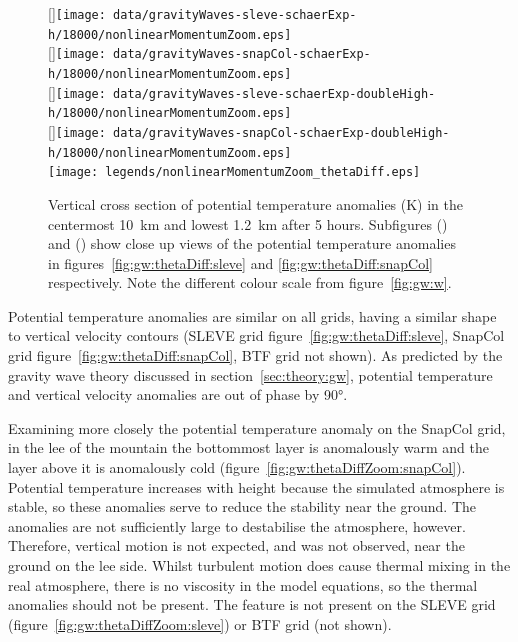 \begin{figure}
	\captionsetup[subfigure]{position=b}
	\centering
	[\textwidth]{\texttt{[image: data/gravityWaves-sleve-schaerExp-h/18000/nonlinearMomentumZoom.eps]}} \\
	[\textwidth]{\texttt{[image: data/gravityWaves-snapCol-schaerExp-h/18000/nonlinearMomentumZoom.eps]}} \\
	[\textwidth]{\texttt{[image: data/gravityWaves-sleve-schaerExp-doubleHigh-h/18000/nonlinearMomentumZoom.eps]}} \\
	[\textwidth]{\texttt{[image: data/gravityWaves-snapCol-schaerExp-doubleHigh-h/18000/nonlinearMomentumZoom.eps]}} \\
%
	\texttt{[image: legends/nonlinearMomentumZoom\_thetaDiff.eps]}
	\caption{Vertical cross section of potential temperature anomalies (\si{\kelvin}) in the centermost \SI{10}{\kilo\meter} and lowest \SI{1.2}{\kilo\meter} after 5 hours.  Subfigures () and () show close up views of the potential temperature anomalies in figures~\ref{fig:gw:thetaDiff:sleve} and \ref{fig:gw:thetaDiff:snapCol} respectively.  Note the different colour scale from figure~\ref{fig:gw:w}.}
	\label{fig:gw:thetaDiffZoom}
\end{figure}

Potential temperature anomalies are similar on all grids, having a similar shape to vertical velocity contours (SLEVE grid figure~\ref{fig:gw:thetaDiff:sleve}, SnapCol grid figure~\ref{fig:gw:thetaDiff:snapCol}, BTF grid not shown).  As predicted by the gravity wave theory discussed in section~\ref{sec:theory:gw}, potential temperature and vertical velocity anomalies are out of phase by \ang{90}.

Examining more closely the potential temperature anomaly on the SnapCol grid, in the lee of the mountain the bottommost layer is anomalously warm and the layer above it is anomalously cold (figure~\ref{fig:gw:thetaDiffZoom:snapCol}).  Potential temperature increases with height because the simulated atmosphere is stable, so these anomalies serve to reduce the stability near the ground.  The anomalies are not sufficiently large to destabilise the atmosphere, however.   Therefore, vertical motion is not expected, and was not observed, near the ground on the lee side.   Whilst turbulent motion does cause thermal mixing in the real atmosphere, there is no viscosity in the model equations, so the thermal anomalies should not be present.  The feature is not present on the SLEVE grid (figure~\ref{fig:gw:thetaDiffZoom:sleve}) or BTF grid (not shown).

